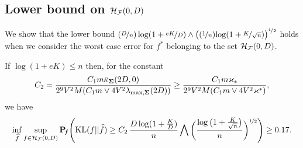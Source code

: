 \subsection{Lower bound on $\mathcal H_\mathcal F(0,D)$} %

 We show that the lower bound ${(\nicefrac{D}n)\log(1+\nicefrac{e K}D)}
\wedge\big((\nicefrac1n){\log(1+\nicefrac{K}{\sqrt{n}})}\big)^{\nicefrac12}$ holds 
when we consider the worst case  error for $f^*$ belonging to the set $\mathcal H_\mathcal F(0,D)$. 
\begin{proposition}
	\label{prop:lower:1}
	If $\log(1+eK)\le  n$ then, for the constant
	\begin{equation}
	C_2=\frac{C_1 m\bar\kappa_{\boldsymbol\Sigma}(2D,0)}{2^{9}V^2 M(C_1m\vee 4V^2\lambda_{\max,\boldsymbol\Sigma}(2D))}
	\ge \frac{C_1 m\varkappa_*}{2^{9}V^2 M(C_1m\vee 4V^2\varkappa^*)},
	\end{equation} 
	we have
	\begin{equation}
	\small
	\inf_{\widehat f}\sup_{f \in \mathcal H_\mathcal F(0,D)}\mathbf P\!_{f}\Bigg({\rm KL}(f||\widehat f)\geq
	C_2\,\frac{D\log(1+\frac{K}{D})}{n}\bigwedge\bigg(\frac{\log\big(1+\frac{K}{\sqrt{n}}\big)}{n}\bigg)^{\nicefrac12}\Bigg)
	\geq 0.17.
	\end{equation}
\end{proposition}

